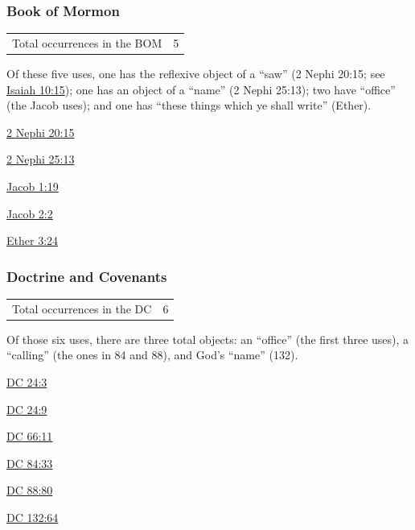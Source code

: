 		
	\subsubsection{Book of Mormon} %
		\label{MAGNIFY-BOM}
	
		\begin{tabular}{ll}
			Total occurrences in the BOM & 5
		\end{tabular}
		
		Of these five uses, one has the reflexive object of a ``saw'' (2 Nephi 20:15; see \hyperref[ISAIAH-10-15]{Isaiah 10:15}); one has an object of a ``name'' (2 Nephi 25:13); two have ``office'' (the Jacob uses); and one has ``these things which ye shall write'' (Ether).
		
		\begin{compactdesc}
			\item[{\hyperref[2NEPHI-20-15]{2 Nephi 20:15}}]
			\item[{\hyperref[2NEPHI-25-13]{2 Nephi 25:13}}]
			\item[{\hyperref[JACOB-1-19]{Jacob 1:19}}]
			\item[{\hyperref[JACOB-2-2]{Jacob 2:2}}]
			\item[{\hyperref[ETHER-3-24]{Ether 3:24}}]
		\end{compactdesc}
		
	\subsubsection{Doctrine and Covenants} %
		\label{MAGNIFY-DC}
	
		\begin{tabular}{ll}
			Total occurrences in the DC & 6
		\end{tabular}
		
		Of those six uses, there are three total objects: an ``office'' (the first three uses), a ``calling'' (the ones in 84 and 88), and God's ``name'' (132).
		
		\begin{compactdesc}
			\item[{\hyperref[DC24-3]{DC 24:3}}]
			\item[{\hyperref[DC24-9]{DC 24:9}}]
			\item[{\hyperref[DC66-11]{DC 66:11}}]
			\item[{\hyperref[DC84-33]{DC 84:33}}]
			\item[{\hyperref[DC88-80]{DC 88:80}}]
			\item[{\hyperref[DC132-64]{DC 132:64}}]
		\end{compactdesc}
		
